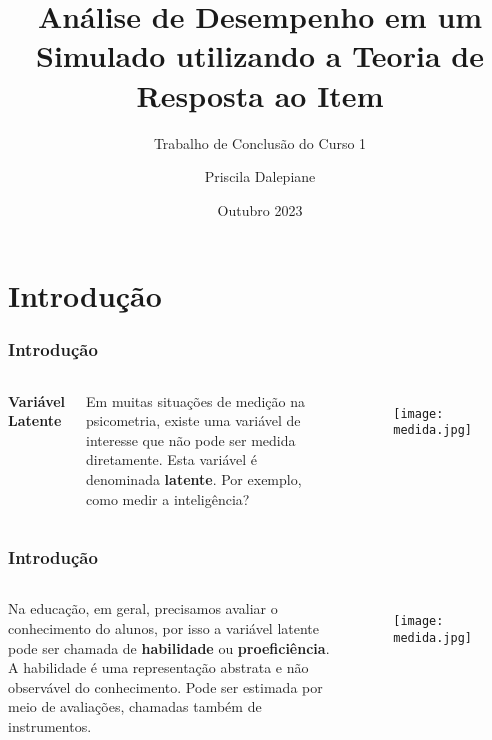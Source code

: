 \documentclass{beamer}
\title[TRI] %
{Análise de Desempenho em um Simulado utilizando a Teoria de Resposta ao Item}
\subtitle{Trabalho de Conclusão do Curso 1}
\author[Priscila] %
{Priscila Dalepiane}
\institute[UFMT] %
{
	
	Bacharelado em Estatística\\
	Universidade Federal de Mato Grosso
	
}
\date[2023] %
{Outubro 2023}
\begin{document}
	
	\frame{\titlepage}
	
	
	
	
	
	
	\section{Introdução}
	
		\begin{frame}
		
		\frametitle{Introdução}
		\begin{columns}
			
			
			\begin{center}
				\textbf{Variável Latente}
			\end{center}
			
			Em muitas situações de medição na psicometria, existe uma variável de interesse que não pode ser medida diretamente. Esta variável é denominada \textbf{latente}. \newline  Por exemplo, como medir a inteligência?
			
	

			
			
			\begin{figure}
				\texttt{[image: medida.jpg]}
			\end{figure}
			
			
		\end{columns}

		
		
	\end{frame}
	\begin{frame}
		
		\frametitle{Introdução}
		\begin{columns}
		
		\column{0.6\textwidth}
		
		Na educação, em geral, precisamos avaliar o conhecimento do alunos, por isso a variável latente pode ser chamada de \textbf{habilidade} ou \textbf{proeficiência}.
		A habilidade é uma representação abstrata e não observável do conhecimento.	\newline\newline
		Pode ser estimada por meio de avaliações, chamadas também de instrumentos.

		\column{0.4\textwidth}
		
		\begin{figure}
			\texttt{[image: medida.jpg]}
		\end{figure}	
		
		\end{columns}
			
	\end{frame}
\end{document}
